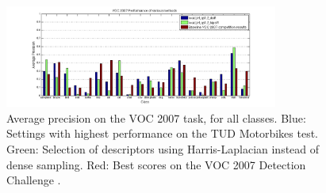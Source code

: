 \begin{figure}[hbt]
    \centering
    \includegraphics[width=0.8\textwidth]{VOC_aps}
    \caption{Average precision on the VOC 2007 task, for all classes. Blue: Settings with highest performance on the TUD Motorbikes test. Green: Selection of descriptors using Harris-Laplacian instead of dense sampling. Red: Best scores on the VOC 2007 Detection Challenge \cite{pascal-voc-2007}.}
    \label{fig:voclocalaps}
\end{figure}

